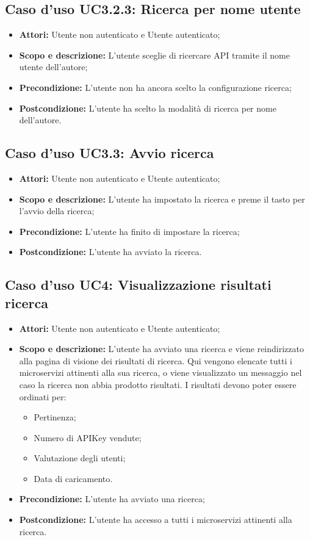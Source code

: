 \documentclass[12pt,a4paper,titlepage]{article}
\begin{document}
	\subsection{Caso d'uso UC3.2.3: Ricerca per nome utente}
	\label{UC3.2.3}
	\begin{itemize}
		\item \textbf{Attori: }Utente non autenticato e Utente autenticato;
		\item \textbf{Scopo e descrizione: }L'utente sceglie di ricercare API tramite il nome utente dell'autore;
		\item \textbf{Precondizione: }L'utente non ha ancora scelto la configurazione ricerca;
		\item \textbf{Postcondizione: }L'utente ha scelto la modalità di ricerca per nome dell'autore.
	\end{itemize}
	\subsection{Caso d'uso UC3.3: Avvio ricerca}
	\label{UC3.3}
	\begin{itemize}
		\item \textbf{Attori: }Utente non autenticato e Utente autenticato;
		\item \textbf{Scopo e descrizione: }L'utente ha impostato la ricerca e preme il tasto per l'avvio della ricerca;
		\item \textbf{Precondizione: }L'utente ha finito di impostare la ricerca;
		\item \textbf{Postcondizione: }L'utente ha avviato la ricerca.
	\end{itemize}
	\subsection{Caso d'uso UC4: Visualizzazione risultati ricerca}
	\label{UC4}
	\begin{itemize}
		\item \textbf{Attori: }Utente non autenticato e Utente autenticato;
		\item \textbf{Scopo e descrizione: }L'utente ha avviato una ricerca e viene reindirizzato alla pagina di visione dei risultati di ricerca. Qui vengono elencate tutti i microservizi attinenti alla sua ricerca, o viene visualizzato un messaggio nel caso la ricerca non abbia prodotto risultati. I risultati devono poter essere ordinati per:
		\begin{itemize}
			\item Pertinenza;
			\item Numero di APIKey vendute;
			\item Valutazione degli utenti;
			\item Data di caricamento.
		\end{itemize}
		\item \textbf{Precondizione: }L'utente ha avviato una ricerca;
		\item \textbf{Postcondizione: }L'utente ha accesso a tutti i microservizi attinenti alla ricerca.
	\end{itemize}
\end{document}
